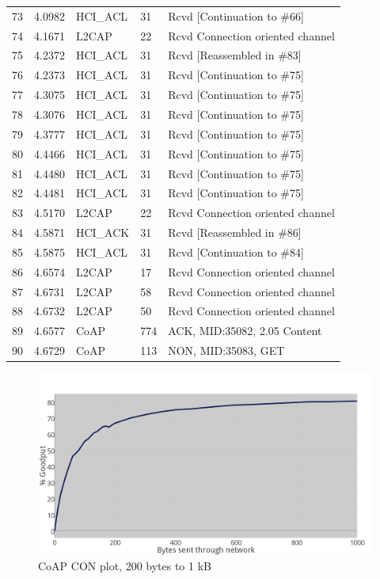 \begin{table}[h]
\begin{tabular}{lllll}
73     & 4.0982  & HCI\_ACL & 31     & Rcvd {[}Continuation to \#66{]}  \\
74     & 4.1671  & L2CAP    & 22     & Rcvd Connection oriented channel \\
75     & 4.2372  & HCI\_ACL & 31     & Rcvd {[}Reassembled in \#83{]}   \\
76     & 4.2373  & HCI\_ACL & 31     & Rcvd {[}Continuation to \#75{]}  \\
77     & 4.3075  & HCI\_ACL & 31     & Rcvd {[}Continuation to \#75{]}  \\
78     & 4.3076  & HCI\_ACL & 31     & Rcvd {[}Continuation to \#75{]}  \\
79     & 4.3777  & HCI\_ACL & 31     & Rcvd {[}Continuation to \#75{]}  \\
80     & 4.4466  & HCI\_ACL & 31     & Rcvd {[}Continuation to \#75{]}  \\
81     & 4.4480  & HCI\_ACL & 31     & Rcvd {[}Continuation to \#75{]}  \\
82     & 4.4481  & HCI\_ACL & 31     & Rcvd {[}Continuation to \#75{]}  \\
83     & 4.5170  & L2CAP    & 22     & Rcvd Connection oriented channel \\
84     & 4.5871  & HCI\_ACK & 31     & Rcvd {[}Reassembled in \#86{]}   \\
85     & 4.5875  & HCI\_ACL & 31     & Rcvd {[}Continuation to \#84{]}  \\
86     & 4.6574  & L2CAP    & 17     & Rcvd Connection oriented channel \\
87     & 4.6731  & L2CAP    & 58     & Rcvd Connection oriented channel \\
88     & 4.6732  & L2CAP    & 50     & Rcvd Connection oriented channel \\
89     & 4.6577  & CoAP     & 774    & ACK, MID:35082, 2.05 Content     \\
90     & 4.6729  & CoAP     & 113    & NON, MID:35083, GET              \\ \hline
\end{tabular}
\end{table}


\newpage

\begin{figure}[ht]
    \centering
    \includegraphics[width=\textwidth]{CON0toK_thickerGRAY.png}    
    \caption{CoAP CON plot, 200 bytes to 1 kB}
    \label{fig:plotCoAPCON200toK}
\end{figure}

